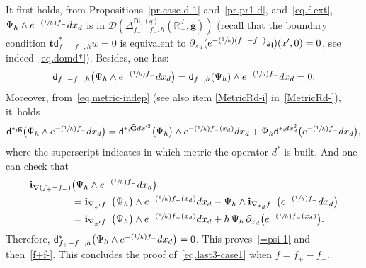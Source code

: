 \documentclass[JEP,XML,SOM,Unicode,NoEqCountersInSection,NoFloatCountersInSection,published]{cedram}
\newcommand{\Psfrac}[2]{(\sfrac{#1}{#2})}
\newcommand{\mbf}[1]{\mathbf{#1}}
\theoremstyle{plain}
\theoremstyle{definition}
\begin{document}
It first holds, from Propositions~\ref{pr.case-d-1}
and~\ref{pr.pr1-d}, and~\eqref{eq.f-ext}, $\Psi_h \wedge e^{-\Psfrac 1h f_- }dx_d$ is in $\mathcal D(\Delta_{f_+ -f_-,h}^{\mathsf{Di},(q)}(\mathbb R_-^d, \mbf g))$ (recall that the boundary condition $\mbf t \mathsf d_{f_+-f-,h}^*w =0$ is equivalent to $\partial_{x_d}(e^{-\Psfrac 1h (f_+-f_-)}\mathsf a_{\mathsf I})(x',0)=0$, see indeed~\eqref{eq.domd*}).
Besides, one has:
\[
\mathsf d_{f_+-f_-,h}\bigl(\Psi_h\wedge e^{-\Psfrac 1h f_-}dx_d\bigr)= \mathsf d_{f_+,h}(\Psi_h) \wedge e^{-\Psfrac 1h f_-}dx_d=0.
\]
Moreover, from~\eqref{eq.metric-indep} (see also item \eqref{MetricRd-i}
in~\ref{MetricRd-}), it~holds
\[
\mathsf d^{*, { \mbf g}}\bigl(\Psi_h\wedge e^{-\Psfrac 1h f_-}dx_d\bigr)= \mathsf
d^{*,\tilde{ \mbf G}dx'^2}\bigl(\Psi_h\bigr) \wedge
e^{-\Psfrac 1h f_-(x_d)}dx_d+ \Psi_h \mathsf
d^{*, dx_d^2}\bigl(e^{-\Psfrac 1h f_-}dx_d\bigr),
\]
where the superscript indicates in which metric the operator $d^*$ is built.
And one can check that
\begin{align*}
\mbf i_{\nabla (f_+-f_-)}&\bigl(\Psi_h\wedge e^{-\Psfrac 1hf_-}dx_d\bigr)\\
&= \mbf i_{\nabla_{x'} f_+} \bigl(\Psi_h\bigr)\wedge e^{-\Psfrac 1h f_-(x_d)}dx_d-\Psi_h\wedge \mbf i_{\nabla_{x_d} f_-}\bigl(e^{-\Psfrac 1h f_-}dx_d\bigr)\\
&=\mbf i_{\nabla_{x'} f_+} \bigl(\Psi_h\bigr)\wedge e^{-\Psfrac 1h f_-(x_d)}dx_d+h\, \Psi_h \, \partial_{x_d}\bigl(e^{-\Psfrac 1h f_-(x_d)}\bigr).
\end{align*}
Therefore, $ \mathsf d^*_{f_+-f_-,h}\bigl(\Psi_h\wedge e^{-\Psfrac 1h f_-}dx_d\bigr)=0$.
This proves~\eqref{=psi-1} and then~\eqref{f+f-}. This concludes the proof of~\eqref{eq.last3-case1} when $f=f_+-f_-$.
\end{document}
